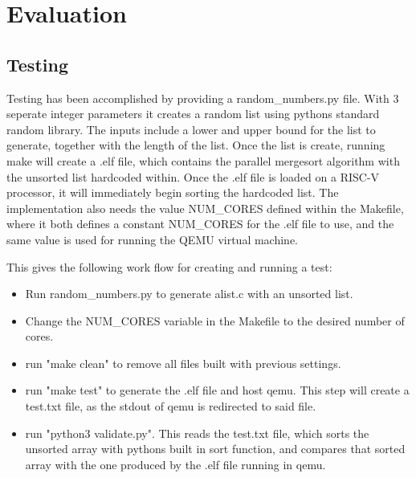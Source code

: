 \section{Evaluation}

\subsection{Testing}
Testing has been accomplished by providing a random\_numbers.py file. With 3
seperate integer parameters it creates a random list using pythons standard
random library. The inputs include a lower and upper bound for the list to
generate, together with the length of the list. Once the list is create, running
make will create a .elf file, which contains the parallel mergesort algorithm
with the unsorted list hardcoded within. Once the .elf file is loaded on a
RISC-V processor, it will immediately begin sorting the hardcoded list. The
implementation also needs the value NUM\_CORES defined within the Makefile,
where it both defines a constant NUM\_CORES for the .elf file to use, and the
same value is used for running the QEMU virtual machine.

This gives the following work flow for creating and running a test:
\begin{itemize}
  \item Run random\_numbers.py to generate alist.c with an unsorted list.
  \item Change the NUM\_CORES variable in the Makefile to the desired number of
    cores.
  \item run "make clean" to remove all files built with previous settings.
  \item run "make test" to generate the .elf file and host qemu. This step will
    create a test.txt file, as the stdout of qemu is redirected to said file.
  \item run "python3 validate.py". This reads the test.txt file, which sorts the
    unsorted array with pythons built in sort function, and compares that sorted
    array with the one produced by the .elf file running in qemu.
\end{itemize}


